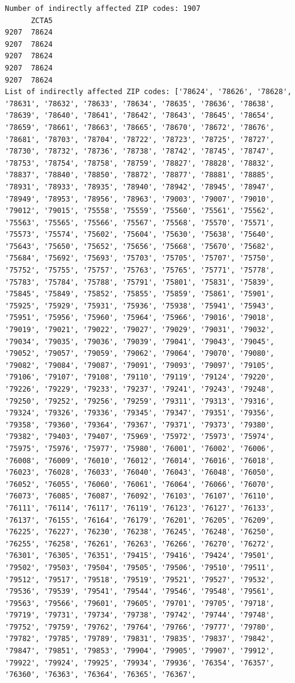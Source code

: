 \documentclass[
  letterpaper,
  DIV=11,
  numbers=noendperiod]{scrartcl}
\begin{document}
\begin{verbatim}
Number of indirectly affected ZIP codes: 1907
      ZCTA5
9207  78624
9207  78624
9207  78624
9207  78624
9207  78624
List of indirectly affected ZIP codes: ['78624', '78626', '78628', '78631', '78632', '78633', '78634', '78635', '78636', '78638', '78639', '78640', '78641', '78642', '78643', '78645', '78654', '78659', '78661', '78663', '78665', '78670', '78672', '78676', '78681', '78703', '78704', '78722', '78723', '78725', '78727', '78730', '78732', '78736', '78738', '78742', '78745', '78747', '78753', '78754', '78758', '78759', '78827', '78828', '78832', '78837', '78840', '78850', '78872', '78877', '78881', '78885', '78931', '78933', '78935', '78940', '78942', '78945', '78947', '78949', '78953', '78956', '78963', '79003', '79007', '79010', '79012', '79015', '75558', '75559', '75560', '75561', '75562', '75563', '75565', '75566', '75567', '75568', '75570', '75571', '75573', '75574', '75602', '75604', '75630', '75638', '75640', '75643', '75650', '75652', '75656', '75668', '75670', '75682', '75684', '75692', '75693', '75703', '75705', '75707', '75750', '75752', '75755', '75757', '75763', '75765', '75771', '75778', '75783', '75784', '75788', '75791', '75801', '75831', '75839', '75845', '75849', '75852', '75855', '75859', '75861', '75901', '75925', '75929', '75931', '75936', '75938', '75941', '75943', '75951', '75956', '75960', '75964', '75966', '79016', '79018', '79019', '79021', '79022', '79027', '79029', '79031', '79032', '79034', '79035', '79036', '79039', '79041', '79043', '79045', '79052', '79057', '79059', '79062', '79064', '79070', '79080', '79082', '79084', '79087', '79091', '79093', '79097', '79105', '79106', '79107', '79108', '79110', '79119', '79124', '79220', '79226', '79229', '79233', '79237', '79241', '79243', '79248', '79250', '79252', '79256', '79259', '79311', '79313', '79316', '79324', '79326', '79336', '79345', '79347', '79351', '79356', '79358', '79360', '79364', '79367', '79371', '79373', '79380', '79382', '79403', '79407', '75969', '75972', '75973', '75974', '75975', '75976', '75977', '75980', '76001', '76002', '76006', '76008', '76009', '76010', '76012', '76014', '76016', '76018', '76023', '76028', '76033', '76040', '76043', '76048', '76050', '76052', '76055', '76060', '76061', '76064', '76066', '76070', '76073', '76085', '76087', '76092', '76103', '76107', '76110', '76111', '76114', '76117', '76119', '76123', '76127', '76133', '76137', '76155', '76164', '76179', '76201', '76205', '76209', '76225', '76227', '76230', '76238', '76245', '76248', '76250', '76255', '76258', '76261', '76263', '76266', '76270', '76272', '76301', '76305', '76351', '79415', '79416', '79424', '79501', '79502', '79503', '79504', '79505', '79506', '79510', '79511', '79512', '79517', '79518', '79519', '79521', '79527', '79532', '79536', '79539', '79541', '79544', '79546', '79548', '79561', '79563', '79566', '79601', '79605', '79701', '79705', '79718', '79719', '79731', '79734', '79738', '79742', '79744', '79748', '79752', '79759', '79762', '79764', '79766', '79777', '79780', '79782', '79785', '79789', '79831', '79835', '79837', '79842', '79847', '79851', '79853', '79904', '79905', '79907', '79912', '79922', '79924', '79925', '79934', '79936', '76354', '76357', '76360', '76363', '76364', '76365', '76367', 
\end{verbatim}
\end{document}
